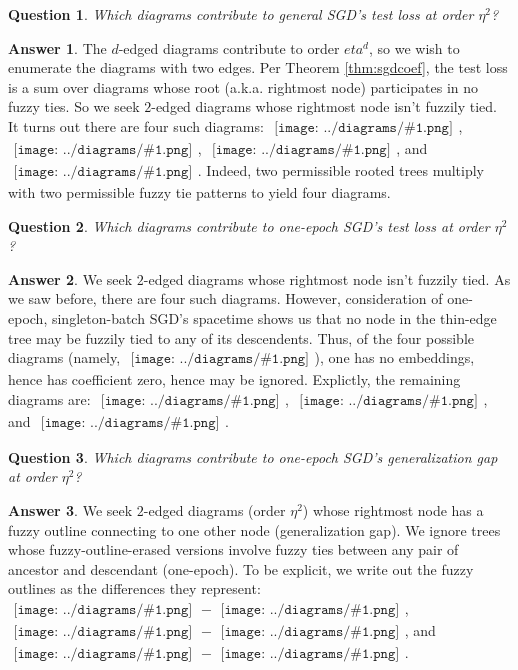 \documentclass{article}
\theoremstyle{plain}
\newtheorem*{quest*}{Question}
\theoremstyle{definition}
\newtheorem*{answ*}{Answer}
\newcommand{\sdia}[1]{\begin{gathered}\texttt{[image: ../diagrams/\#1.png]}\end{gathered}}
\begin{document}
            \begin{quest*}
                Which diagrams contribute to general SGD's test loss at order
                $\eta^2$? 
            \end{quest*}
            \begin{answ*}
                The $d$-edged diagrams contribute to order $eta^d$, so we wish
                to enumerate the diagrams with two edges.  Per Theorem
                \ref{thm:sgdcoef}, the test loss is a sum over diagrams whose
                root (a.k.a. rightmost node) participates in no fuzzy ties.  So
                we seek $2$-edged diagrams whose rightmost node isn't fuzzily
                tied.  It turns out there are four such diagrams:
                $\sdia{(0-1-2)(01-12)}$,
                $\sdia{(01-2)(01-12)}$,
                $\sdia{(0-1-2)(02-12)}$, and
                $\sdia{(01-2)(02-12)}$.
                Indeed, two permissible rooted trees multiply with two
                permissible fuzzy tie patterns to yield four diagrams.
            \end{answ*}

            \begin{quest*}
                Which diagrams contribute to one-epoch SGD's test
                loss at order $\eta^2$? 
            \end{quest*}
            \begin{answ*}
                We seek $2$-edged diagrams whose rightmost node isn't fuzzily
                tied.  As we saw before, there are four such diagrams.
                However, consideration of one-epoch, singleton-batch SGD's
                spacetime shows us that no node in the thin-edge tree may be
                fuzzily tied to any of its descendents.  Thus, of the four
                possible diagrams (namely, $\sdia{(01-2)(01-12)}$), one has no
                embeddings, hence has coefficient zero, hence may be ignored.
                Explictly, the remaining diagrams are:
                $\sdia{(0-1-2)(01-12)}$,
                $\sdia{(01-2)(01-12)}$, and
                $\sdia{(01-2)(02-12)}$.
            \end{answ*}

            \begin{quest*}
                Which diagrams contribute to one-epoch SGD's
                generalization gap at order $\eta^2$? 
            \end{quest*}
            \begin{answ*}
                We seek $2$-edged diagrams (order $\eta^2$) whose rightmost
                node has a fuzzy outline connecting to one other node
                (generalization gap).  We ignore trees whose
                fuzzy-outline-erased versions involve fuzzy ties between any
                pair of ancestor and descendant (one-epoch).  To be explicit,
                we write out the fuzzy outlines as the differences they
                represent: 
                $\sdia{(0-12)(01-12)}-\sdia{(0-1-2)(01-12)}$,
                $\sdia{(0-12)(02-12)}-\sdia{(0-1-2)(02-12)}$, and
                $\sdia{(012)(02-12)} -\sdia{(01-2)(02-12)} $.
            \end{answ*}
\end{document}
